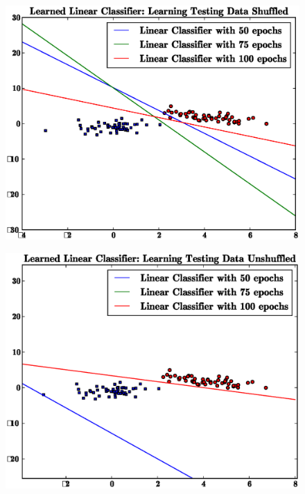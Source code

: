 \documentclass[letterpaper,10pt,titlepage]{article}
\begin{document}
\begin{figure}[th!]
\centering
\includegraphics[width=5in]{test_data_shuffled.eps} 
\end{figure} 
\pagebreak
\pagebreak
\begin{figure}[th!]
\centering
\includegraphics[width=5in]{test_data_unshuffled.eps} 
\end{figure} 
\pagebreak
\\[15mm]
\end{document}
